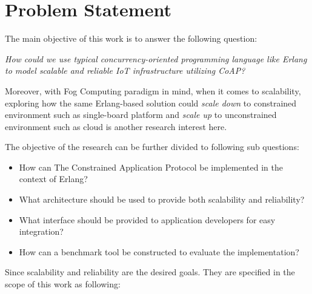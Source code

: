 \chapter{Problem Statement}\label{ch2}



The main objective of this work is to answer the following question:

\textit{How could we use typical concurrency-oriented programming language like Erlang to model scalable and reliable IoT infrastructure utilizing CoAP?}

Moreover, with Fog Computing paradigm in mind, when it comes to scalability, exploring how the same Erlang-based solution could \textit{scale down} to constrained environment such as single-board platform and \textit{scale up} to unconstrained environment such as cloud is another research interest here.

The objective of the research can be further divided to following sub questions:

\begin{itemize}

\item How can The Constrained Application Protocol be implemented in the context of Erlang? 
\item What architecture should be used to provide both scalability and reliability? 
\item What interface should be provided to application developers for easy integration? 
\item How can a benchmark tool be constructed to evaluate the implementation? 

\end{itemize}

Since scalability and reliability are the desired goals. They are specified in the scope of this work as following:


